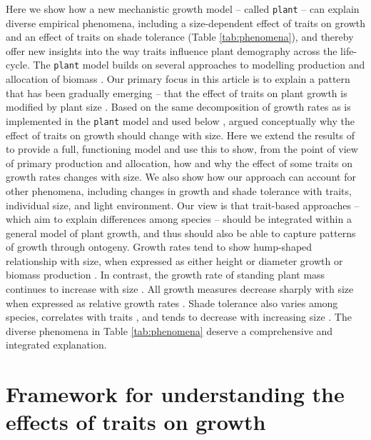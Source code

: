 \documentclass[9pt,twocolumn,twoside]{pnas-new}
\newcommand{\plant}{\texttt{plant}}
\begin{document}
Here we show how a new mechanistic growth model -- called {\plant} \citep{Falster-2016} -- can explain diverse empirical phenomena, including a size-dependent effect of traits on growth and an effect of traits on shade tolerance (Table \ref{tab:phenomena}), and thereby offer new insights into the way traits influence plant demography across the life-cycle. The {\plant} model builds on several approaches to modelling production and allocation of biomass \citep[e.g.][]{Givnish-1988, Yokozawa-1995,Makela-1997, Moorcroft-2001, Sitch-2008, Falster-2011, King-2011, Gibert-2016}. Our primary focus in this article is to explain a pattern that has been gradually emerging -- that the effect of traits on plant growth is modified by plant size \citep{Ruger-2012, Iida-2014, Gibert-2016}. Based on the same decomposition of growth rates as is implemented in the {\plant} model and used below \citep[from][]{Falster-2011}, \citep{Gibert-2016} argued conceptually why the effect of traits on growth should change with size. Here we extend the results of \citep{Gibert-2016} to provide a full, functioning model and use this to show, from the point of view of primary production and allocation, how and why the effect of some traits on growth rates changes with size. We also show how our approach can account for other phenomena, including changes in growth and shade tolerance with traits, individual size, and light environment. Our view is that trait-based approaches -- which aim to explain differences among species -- should be integrated within a general model of plant growth, and thus should also be able to capture patterns of growth through ontogeny. Growth rates tend to show hump-shaped relationship with size, when expressed as either height \citep{Sillett-2010, King-2011} or diameter growth \citep{Canham-2004, Canham-2006, Herault-2011} or biomass production \citep{Givnish-1988, Koch-2004}. In contrast, the growth rate of standing plant mass continues to increase with size \citep{Sillett-2010, Stephenson-2014}. All growth measures decrease sharply with size when expressed as relative growth rates \citep{Rees-2010, Iida-2014}. Shade tolerance also varies among species, correlates with traits \citep{Messier-1999, Lusk-2008, Poorter-2006}, and tends to decrease with increasing size \citep{Givnish-1988, Kneeshaw-2006, Lusk-2008}. The diverse phenomena in Table \ref{tab:phenomena} deserve a comprehensive and integrated explanation.

\section*{Framework for understanding the effects of traits on growth}
\end{document}
